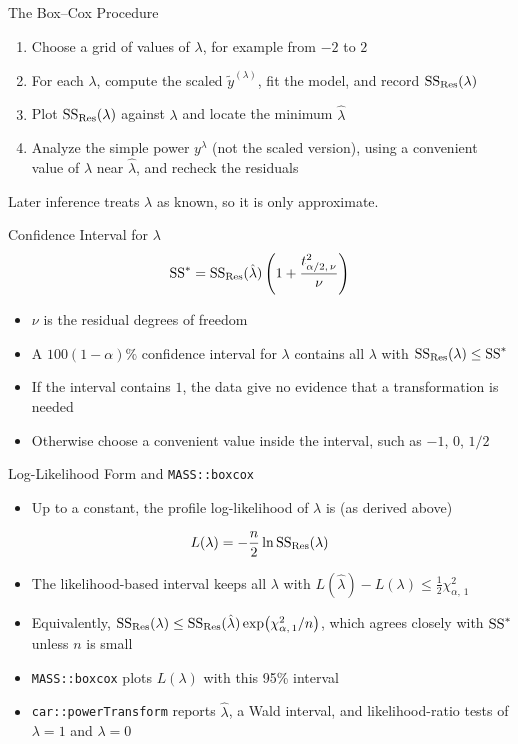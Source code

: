 \begin{frame}{The Box--Cox Procedure}
\begin{enumerate}
    \item Choose a grid of values of $\lambda$, for example from $-2$ to $2$
    \item For each $\lambda$, compute the scaled $\tilde{y}^{(\lambda)}$, fit the model, and record $\mathrm{SS}_{\mathrm{Res}}(\lambda)$
    \item Plot $\mathrm{SS}_{\mathrm{Res}}(\lambda)$ against $\lambda$ and locate the minimum $\hat{\lambda}$
    \item Analyze the simple power $y^\lambda$ (not the scaled version), using a convenient value of $\lambda$ near $\hat{\lambda}$, and recheck the residuals
\end{enumerate}
Later inference treats $\lambda$ as known, so it is only approximate.
\end{frame}


\begin{frame}{Confidence Interval for $\lambda$}
\begin{align*}
    \mathrm{SS}^{*} = \mathrm{SS}_{\mathrm{Res}}(\hat{\lambda})\left(1 + \frac{t_{\alpha/2,\,\nu}^2}{\nu}\right)
\end{align*}
\begin{itemize}
    \item $\nu$ is the residual degrees of freedom
    \item A $100(1-\alpha)\%$ confidence interval for $\lambda$ contains all $\lambda$ with $\mathrm{SS}_{\mathrm{Res}}(\lambda) \le \mathrm{SS}^{*}$
    \item If the interval contains $1$, the data give no evidence that a transformation is needed
    \item Otherwise choose a convenient value inside the interval, such as $-1$, $0$, $1/2$
\end{itemize}
\end{frame}


\begin{frame}{Log-Likelihood Form and \texttt{MASS::boxcox}}
\begin{itemize}
    \item Up to a constant, the profile log-likelihood of $\lambda$ is (as derived above)
\end{itemize}
\begin{align*}
    L(\lambda) = -\frac{n}{2} \ln \mathrm{SS}_{\mathrm{Res}}(\lambda)
\end{align*}
\begin{itemize}
    \item The likelihood-based interval keeps all $\lambda$ with $L(\hat{\lambda}) - L(\lambda) \le \tfrac{1}{2}\chi^2_{\alpha,\,1}$
    \item Equivalently, $\mathrm{SS}_{\mathrm{Res}}(\lambda) \le \mathrm{SS}_{\mathrm{Res}}(\hat{\lambda})\exp\!\big(\chi^2_{\alpha,\,1}/n\big)$, which agrees closely with $\mathrm{SS}^{*}$ unless $n$ is small
    \item \texttt{MASS::boxcox} plots $L(\lambda)$ with this 95\% interval
    \item \texttt{car::powerTransform} reports $\hat{\lambda}$, a Wald interval, and likelihood-ratio tests of $\lambda = 1$ and $\lambda = 0$
\end{itemize}
\end{frame}




